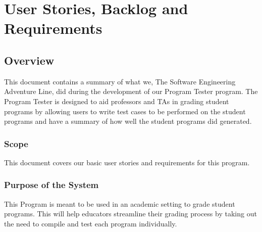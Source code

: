 \chapter{User Stories, Backlog and Requirements}
\section{Overview}

This document contains a summary of what we, The Software Engineering Adventure Line, did during the development of our Program Tester program. The Program Tester is designed to aid professors and TAs in grading student programs by allowing users to write test cases to be performed on the student programs and have a summary of how well the student programs did generated.









\subsection{Scope}
This document covers our basic user stories and requirements for this program.




\subsection{Purpose of the System}
This Program is meant to be used in an academic setting to grade student programs. 
This will help educators streamline their grading process by taking out the need to 
compile and test each program individually.

